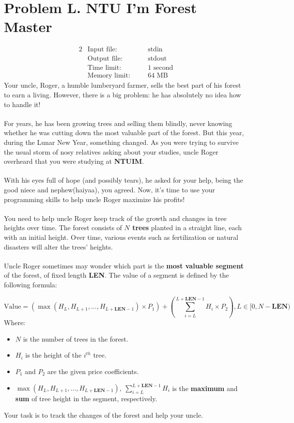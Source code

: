 \documentclass[12pt,a4paper]{article}
\begin{document}
\newpage
\section*{\fontsize{18}{12}Problem L. NTU I'm Forest Master}

\begin{alignat*} {2}
 &   \text{Input file:}   \quad     &&\text{stdin}\\
 &   \text{Output file:}  \quad     &&\text{stdout}\\
 &   \text{Time limit:}   \quad     &&\text{1 second}\\
 &   \text{Memory limit:} \quad     &&\text{64 MB}
\end{alignat*}
\noindent
Your uncle, Roger, a humble lumberyard farmer, sells the best part of his forest to earn a living. However, there is a big problem: he has absolutely no idea how to handle it! 
\\\\
\noindent
For years, he has been growing trees and selling them blindly, never knowing whether he was cutting down the most valuable part of the forest. But this year, during the Lunar New Year, something changed. As you were trying to survive the usual storm of nosy relatives asking about your studies, uncle Roger overheard that you were studying at \textbf{NTUIM}.  
\\\\
\noindent
With his eyes full of hope (and possibly tears), he asked for your help, being the good niece and nephew(haiyaa), you agreed. Now, it's time to use your programming skills to help uncle Roger maximize his profits!
\\\\
\noindent
You need to help uncle Roger keep track of the growth and changes in tree heights over time. The forest consists of \textbf{\(N\) trees} planted in a straight line, each with an initial height. Over time, various events such as fertilization or natural disasters will alter the trees' heights.
\\\\
\noindent
Uncle Roger sometimes may wonder which part is the \textbf{most valuable segment} of the forest, of fixed length \textbf{LEN}. The value of a segment is defined by the following formula:

\[
\text{Value} = (\max(H_L, H_{L+1}, \dots, H_{L+\textbf{LEN}-1}) \times P_1) + (\sum_{i=L}^{L+\textbf{LEN}-1} H_i \times P_2), L\in[0,N-\textbf{LEN})
\]
\noindent
Where:
\begin{itemize}
    \item \( N \) is the number of trees in the forest.
    \item \( H_i \) is the height of the \( i^{th} \) tree.
    \item \( P_1 \) and \( P_2 \) are the given price coefficients.
    \item \( \max(H_L, H_{L+1}, \dots, H_{L+\textbf{LEN}-1}),\ \sum_{i=L}^{L+\textbf{LEN}-1} H_i\) is the \textbf{maximum} and \textbf{sum} of tree height in the segment, respectively.
\end{itemize}
\noindent
Your task is to track the changes of the forest and help your uncle.
\end{document}
